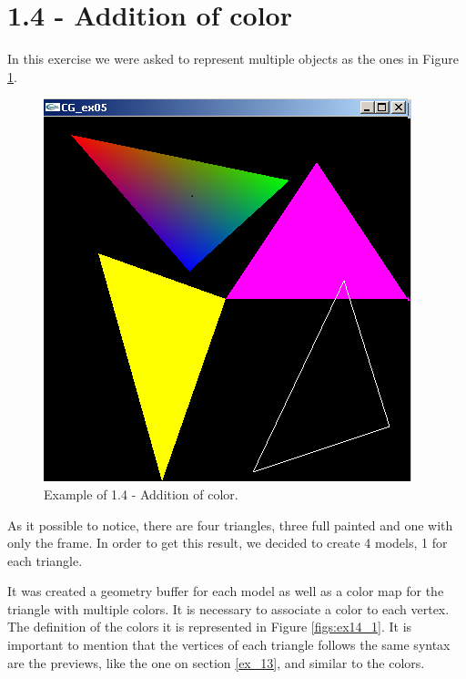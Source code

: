 \documentclass[12pt]{article}
\begin{document}
\section*{1.4 - Addition of color}
\label{ex_14}

In this exercise we were asked to represent multiple objects as the ones in Figure \ref{figs:ex14_exemplo}.

\begin{figure}[h!]
    \centering
        \includegraphics[width = \textwidth]{figs/ex14_exemplo.png}
        \caption{Example of 1.4 - Addition of color.}
        \label{figs:ex14_exemplo}
\end{figure}

\noindent
As it possible to notice, there are four triangles, three full painted and one with only the frame. In order to get this result, we decided to create 4 models, 1 for each triangle.\par

It was created a geometry buffer for each model as well as a color map for the triangle with multiple colors. It is necessary to associate a color to each vertex. The definition of the colors it is represented in Figure \ref{figs:ex14_1}. It is important to mention that the vertices of each triangle follows the same syntax are the previews, like the one on section \ref{ex_13}, and similar to the colors.
\end{document}
